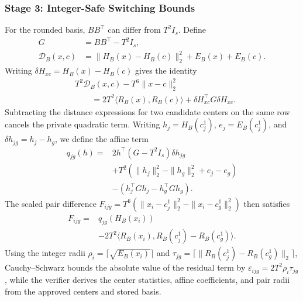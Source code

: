 \documentclass[5p,times,twocolumn]{elsarticle}
\begin{document}
\subsubsection{Stage 3: Integer-Safe Switching Bounds}
\label{sec:methodology-switching}
For the rounded basis, $BB^\top$ can differ from $T^2I_s$. Define
\begin{equation}
 \begin{aligned}
 G&=BB^\top-T^2I_s,\\
 \mathcal D_B(x,c)&=\|H_B(x)-H_B(c)\|_2^2+E_B(x)+E_B(c).
 \end{aligned}
 \label{eq:methodology-gram}
\end{equation}
Writing $\delta H_{xc}=H_B(x)-H_B(c)$ gives the identity
\begin{equation}
 \begin{aligned}
 &T^2\mathcal D_B(x,c)-T^6\|x-c\|_2^2\\
 &\qquad=2T^2\langle R_B(x),R_B(c)\rangle
       +\delta H_{xc}^\top G\delta H_{xc}.
 \end{aligned}
 \label{eq:methodology-rounded-identity}
\end{equation}
Subtracting the distance expressions for two candidate centers on the same row cancels the private quadratic term. Writing $h_j=H_B(c^1_j)$, $e_j=E_B(c^1_j)$, and $\delta h_{jg}=h_j-h_g$, we define the affine term
\begin{align}
 q_{jg}(h)={}&2h^\top(G-T^2I_s)\delta h_{jg}\nonumber\\
 &+T^2(\|h_j\|_2^2-\|h_g\|_2^2+e_j-e_g)\nonumber\\
 &-(h_j^\top Gh_j-h_g^\top Gh_g).
 \label{eq:methodology-affine}
\end{align}
The scaled pair difference $F_{ijg}=T^6(\|x_i-c^1_j\|_2^2-\|x_i-c^1_g\|_2^2)$ then satisfies
\begin{equation}
 \begin{aligned}
 F_{ijg}={}&q_{jg}(H_B(x_i))\\
 &-2T^2\langle R_B(x_i),R_B(c^1_j)-R_B(c^1_g)\rangle.
 \end{aligned}
 \label{eq:methodology-pair-difference}
\end{equation}
Using the integer radii $\rho_i=\lceil\sqrt{E_B(x_i)}\rceil$ and $\tau_{jg}=\lceil\|R_B(c^1_j)-R_B(c^1_g)\|_2\rceil$, Cauchy--Schwarz bounds the absolute value of the residual term by $\varepsilon_{ijg}=2T^2\rho_i\tau_{jg}$, while the verifier derives the center statistics, affine coefficients, and pair radii from the approved centers and stored basis.
\end{document}
